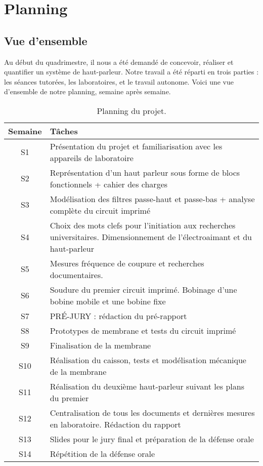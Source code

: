 

\section{Planning}

\subsection{Vue d'ensemble}
Au début du quadrimestre, il nous a été demandé de concevoir, réaliser et quantifier un système de haut-parleur.
Notre travail a été réparti en trois parties : les séances tutorées, les laboratoires, et le travail autonome. 
Voici une vue d'ensemble de notre planning, semaine après semaine. 

\begin{table}[!htb]
	\centering
	\begin{tabular}{|c|p{9cm}|}
		\hline 
		Semaine & Tâches \\
		\hline
			S1 & Présentation du projet et familiarisation avec les appareils de laboratoire \\
			S2 & Représentation d'un haut parleur sous forme de blocs fonctionnels + cahier des charges \\
			S3 & Modélisation des filtres passe-haut et passe-bas + analyse complète du circuit imprimé \\
			S4 & Choix des mots clefs pour l'initiation aux recherches universitaires. Dimensionnement de l'électroaimant et du haut-parleur \\
			S5 & Mesures fréquence de coupure et recherches documentaires. \\
			S6 & Soudure du premier circuit imprimé. Bobinage d'une bobine mobile et une bobine fixe \\
			S7 & PRÉ-JURY : rédaction du pré-rapport \\
			S8 & Prototypes de membrane et tests du circuit imprimé \\
			S9 & Finalisation de la membrane \\
			S10 & Réalisation du caisson, tests et modélisation mécanique de la membrane \\
			S11 & Réalisation du deuxième haut-parleur suivant les plans du premier \\
			S12 & Centralisation de tous les documents et dernières mesures en laboratoire. Rédaction du rapport \\
			S13 & Slides pour le jury final et préparation de la défense orale \\
			S14 & Répétition de la défense orale \\
		\hline
	\end{tabular}
	\caption{Planning du projet.}
\end{table}

